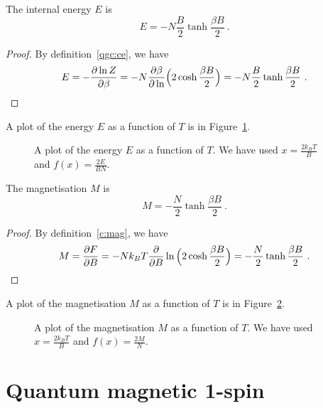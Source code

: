     The internal energy $E$ is 
    \begin{equation*}
        E = - N \frac{B}{2} \tanh \frac{\beta B}{2} ~.
    \end{equation*}
    \begin{proof}
        By definition~\eqref{qgc:ce}, we have 
        \begin{equation*}
            E = - \frac{\partial\ln Z}{\partial\beta} = - N \frac{\partial\beta}{\partial\ln} \Big (2 \cosh \frac{\beta B}{2} \Big) = - N \frac{B}{2} \tanh \frac{\beta B}{2} ~.
        \end{equation*}
    \end{proof}
    A plot of the energy $E$ as a function of $T$ is in Figure~\ref{qm:e}.
    \begin{figure}
        \centering
        \caption{A plot of the energy $E$ as a function of $T$. We have used $x = \frac{2 k_B T}{B} $ and $f(x) = \frac{2E}{BN}$.}
        \label{qm:e}
    \end{figure}

    The magnetisation $M$ is 
    \begin{equation*}
        M = - \frac{N}{2} \tanh \frac{\beta B}{2} ~. 
    \end{equation*}
    \begin{proof}
        By definition~\eqref{c:mag}, we have
        \begin{equation*}
            M = \frac{\partial F}{\partial B} = - N k_B T \frac{\partial}{\partial B} \ln \Big ( 2 \cosh \frac{\beta B}{2} \Big) = - \frac{N}{2} \tanh \frac{\beta B}{2} ~.
        \end{equation*}
    \end{proof}
    A plot of the magnetisation $M$ as a function of $T$ is in Figure~\ref{qm:m}.
    \begin{figure}
        \centering
        \caption{A plot of the magnetisation $M$ as a function of $T$. We have used $x = \frac{2 k_B T}{B} $ and $f(x) = \frac{2M}{N}$.}
        \label{qm:m}
    \end{figure}

\section{Quantum magnetic 1-spin}

